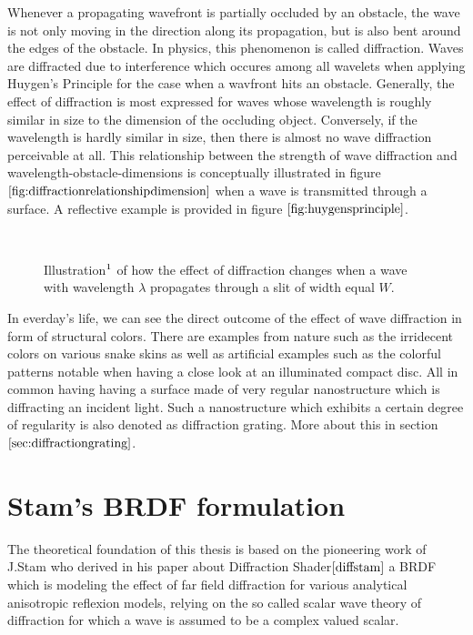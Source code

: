 Whenever a propagating wavefront is partially occluded by an obstacle, the wave is not only moving in the direction along its propagation, but is also bent around the edges of the obstacle. In physics, this phenomenon is called diffraction. Waves are diffracted due to interference which occures among all wavelets when applying Huygen's Principle for the case when a wavfront hits an obstacle. Generally, the effect of diffraction is most expressed for waves whose wavelength is roughly similar in size to the dimension of the occluding object. Conversely, if the wavelength is hardly similar in size, then there is almost no wave diffraction perceivable at all. This relationship between the strength of wave diffraction and wavelength-obstacle-dimensions is conceptually illustrated in figure $\ref{fig:diffractionrelationshipdimension}$ when a wave is transmitted through a surface. A reflective example is provided in figure $\ref{fig:huygensprinciple}$.

\begin{figure}[H]
  \centering
~
~
  \caption[diffractiondiemsnion]{Illustration$\footnotemark$ of how the effect of diffraction changes when a wave with wavelength $\lambda$ propagates through a slit of width equal $W$.}
  \label{fig:diffractionrelationshipdimension}
\end{figure}

In everday's life, we can see the direct outcome of the effect of wave diffraction in form of structural colors. There are examples from nature such as the irridecent colors on various snake skins as well as artificial examples such as the colorful patterns notable when having a close look at an illuminated compact disc. All in common having having a surface made of very regular nanostructure which is diffracting an incident light. Such a nanostructure which exhibits a certain degree of regularity is also denoted as diffraction grating. More about this in section $\ref{sec:diffractiongrating}$.

\section{Stam's BRDF formulation}
\label{sec:sumstam}
The theoretical foundation of this thesis is based on the pioneering work of J.Stam who derived in his paper about Diffraction Shader$\cite{diffstam}$ a BRDF which is modeling the effect of far field diffraction for various analytical anisotropic reflexion models, relying on the so called scalar wave theory of diffraction for which a wave is assumed to be a complex valued scalar. \\

